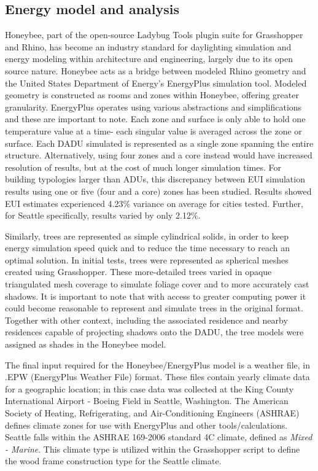 \documentclass[sagev,times,Royal]{sagej}
\begin{document}
\subsection{Energy model and analysis}
Honeybee, part of the open-source Ladybug Tools plugin suite for Grasshopper and Rhino, has become an industry standard for daylighting simulation and energy modeling within architecture and engineering, largely due to its open source nature\cite{mackey2018tool}. Honeybee acts as a bridge between modeled Rhino geometry and the United States Department of Energy's EnergyPlus simulation tool. Modeled geometry is constructed as rooms and zones within Honeybee, offering greater granularity. EnergyPlus operates using various abstractions and simplifications and these are important to note\cite{EnergyPlusTMVersionDocumentation2021}. Each zone and surface is only able to hold one temperature value at a time- each singular value is averaged across the zone or surface. Each DADU simulated is represented as a single zone spanning the entire structure. Alternatively, using four zones and a core instead would have increased resolution of results, but at the cost of much longer simulation times. For building typologies larger than ADUs, this discrepancy between EUI simulation results using one or five (four and a core) zones has been studied\cite{SingleZoneVs2018}. Results showed EUI estimates experienced 4.23\% variance on average for cities tested. Further, for Seattle specifically, results varied by only 2.12\%.
 
Similarly, trees are represented as simple cylindrical solids, in order to keep energy simulation speed quick and to reduce the time necessary to reach an optimal solution. In initial tests, trees were represented as spherical meshes created using Grasshopper. These more-detailed trees varied in opaque triangulated mesh coverage to simulate foliage cover and to more accurately cast shadows. It is important to note that with access to greater computing power it could become reasonable to represent and simulate trees in the original format. Together with other context, including the associated residence and nearby residences capable of projecting shadows onto the DADU, the tree models were assigned as shades in the Honeybee model. 

The final input required for the Honeybee/EnergyPlus model is a weather file, in .EPW (EnergyPlus Weather File) format. These files contain yearly climate data for a geographic location; in this case data was collected at the King County International Airport - Boeing Field in Seattle, Washington. The American Society of Heating, Refrigerating, and Air-Conditioning Engineers (ASHRAE) defines climate zones for use with EnergyPlus and other tools/calculations. Seattle falls within the ASHRAE 169-2006 standard 4C climate, defined as \textit{Mixed - Marine}. This climate type is utilized within the Grasshopper script to define the wood frame construction type for the Seattle climate. 
\end{document}
